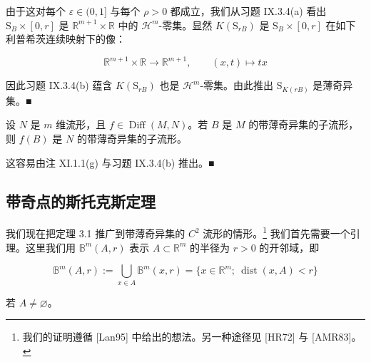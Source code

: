 \begin{example}
由于这对每个 $ \varepsilon \in (0,1] $ 与每个 $ \rho > 0 $ 都成立，我们从习题 IX.3.4(a) 看出 $ \mathrm{S}_B \times [0,r] $ 是 $ \mathbb{R}^{m+1} \times \mathbb{R} $ 中的 $ \mathcal{H}^m $-零集。显然 $ K(\mathrm{S}_{rB}) $ 是 $ \mathrm{S}_B \times [0,r] $ 在如下利普希茨连续映射下的像：

\[
\mathbb{R}^{m+1} \times \mathbb{R} \to \mathbb{R}^{m+1}, \qquad (x,t) \mapsto tx
\]

因此习题 IX.3.4(b) 蕴含 $ K(\mathrm{S}_{rB}) $ 也是 $ \mathcal{H}^m $-零集。由此推出 $ \mathrm{S}_{K(rB)} $ 是薄奇异集。\nobreak\hspace{0.35em}■

\begin{items}
\item[（h）]

设 $ N $ 是 $ m $ 维流形，且 $ f \in \operatorname{Diff}(M,N) $。若 $ B $ 是 $ M $ 的带薄奇异集的子流形，则 $ f(B) $ 是 $ N $ 的带薄奇异集的子流形。

\proofhead
这容易由注 XI.1.1(g) 与习题 IX.3.4(b) 推出。\nobreak\hspace{0.35em}■
\end{items}

\end{example}

\subsection*{带奇点的斯托克斯定理}

我们现在把定理 3.1 推广到带薄奇异集的 $ C^2 $ 流形的情形。\footnote{我们的证明遵循 [Lan95] 中给出的想法。另一种途径见 [HR72] 与 [AMR83]。} 我们首先需要一个引理。这里我们用 $ \mathbb{B}^m(A,r) $ 表示 $ A \subset \mathbb{R}^m $ 的半径为 $ r > 0 $ 的开邻域，即

\[
\mathbb{B}^m(A,r) := \bigcup_{x\in A}\mathbb{B}^m(x,r) = \{ x\in\mathbb{R}^m ;\ \operatorname{dist}(x,A) < r \}
\]

若 $ A \neq \varnothing $。

